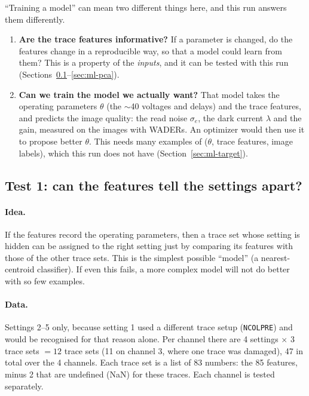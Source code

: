 \documentclass[10pt]{article}
\newcommand{\code}[1]{\texttt{#1}}
\begin{document}
``Training a model'' can mean two different things here, and this run answers them differently.

\begin{enumerate}
\item \textbf{Are the trace features informative?} If a parameter is changed, do the features change in a reproducible
  way, so that a model could learn from them? This is a property of the \emph{inputs}, and it can be tested with this run
  (Sections~\ref{sec:ml-test}--\ref{sec:ml-pca}).
\item \textbf{Can we train the model we actually want?} That model takes the operating parameters $\theta$ (the $\sim$40
  voltages and delays) and the trace features, and predicts the image quality: the read noise $\sigma_e$, the dark current
  $\lambda$ and the gain, measured on the images with WADERs. An optimizer would then use it to propose better $\theta$.
  This needs many examples of ($\theta$, trace features, image labels), which this run does not have
  (Section~\ref{sec:ml-target}).
\end{enumerate}

\subsection{Test 1: can the features tell the settings apart?}
\label{sec:ml-test}

\paragraph{Idea.} If the features record the operating parameters, then a trace set whose setting is hidden can be assigned
to the right setting just by comparing its features with those of the other trace sets. This is the simplest possible
``model'' (a nearest-centroid classifier). If even this fails, a more complex model will not do better with so few examples.

\paragraph{Data.} Settings 2--5 only, because setting 1 used a different trace setup (\code{NCOLPRE}) and would be
recognised for that reason alone. Per channel there are 4 settings $\times$ 3 trace sets $= 12$ trace sets (11 on channel 3,
where one trace was damaged), 47 in total over the 4 channels. Each trace set is a list of 83 numbers: the 85 features, minus
2 that are undefined (NaN) for these traces. Each channel is tested separately.
\end{document}
